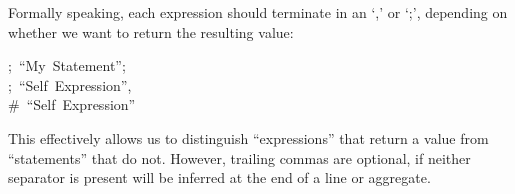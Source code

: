 \documentclass[preprint]{{sigplanconf}}
\begin{document}
\begin{table}[tbp]
\begin{mdcenter}
\mdhr{}%

\noindent{}%
\end{mdcenter}\label{sec-table-terminals}%
\end{table}%

Formally speaking, each expression should terminate in an \textquoteleft{},\textquoteright{} or \textquoteleft{};\textquoteright{}, depending
on whether we want to return the resulting value:%
\begin{mdpre}%
\noindent;~“{My}~{Statement}”;~\\
;~“{Self}~{Expression}”,~\\
{\#~“Self~Expression”~}%
\end{mdpre}\noindent{}This effectively allows us to distinguish \textquotedblleft{}expressions\textquotedblright{} that return a
value from \textquotedblleft{}statements\textquotedblright{} that do not. However, trailing commas are
optional, if neither separator is present will be inferred at the end of
a line or aggregate.
\end{document}
